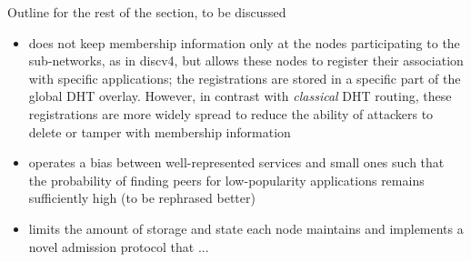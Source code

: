 Outline for the rest of the section, to be discussed
\begin{itemize}
  \item \sysname does not keep membership information only at the nodes participating to the sub-networks, as in discv4, but allows these nodes to register their association with specific applications; the registrations are stored in a specific part of the global DHT overlay. However, in contrast with \emph{classical} DHT routing, these registrations are more widely spread to reduce the ability of attackers to delete or tamper with membership information
  \item \sysname operates a bias between well-represented services and small ones such that the probability of finding peers for low-popularity applications remains sufficiently high (to be rephrased better) 
  \item \sysname limits the amount of storage and state each node maintains and implements a novel admission protocol that ...
\end{itemize}

